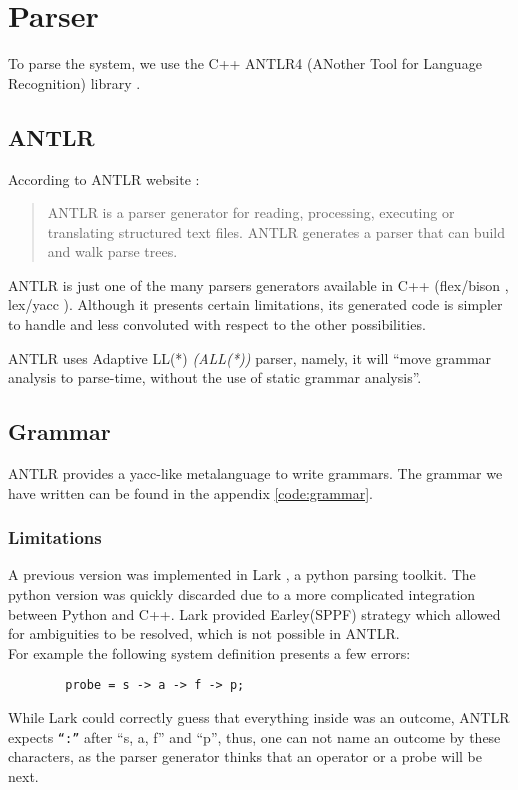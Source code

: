 \section{Parser}
        To parse the system, we use the C++ ANTLR4 (ANother Tool for Language Recognition) library \cite{antlr4}. 
        \subsection{ANTLR}
    According to ANTLR website \cite{antlr4}: 
    \begin{quote}
        ANTLR is a parser generator for reading, processing, executing or translating structured text files. ANTLR generates a parser that can build and walk parse trees.
    \end{quote}

 ANTLR is just one of the many parsers generators available in C++ (flex/bison \cite{flexb}, lex/yacc \cite{lexy}). Although it presents certain limitations, its generated code is simpler to handle and less convoluted with respect to the other possibilities.

        ANTLR uses Adaptive LL(*) \textit{(ALL(*))} parser, namely, it will ``move grammar analysis to parse-time, without the use of static grammar analysis''. \cite{antlr}

        \subsection{Grammar}
            ANTLR provides a yacc-like metalanguage \cite{antlr} to write grammars. The grammar we have written can be found in the appendix \ref{code:grammar}.
              
    \subsubsection{Limitations}
        A previous version was implemented in Lark \cite{lark}, a python parsing toolkit. The python version was quickly discarded due to a more complicated integration between Python and C++. Lark provided Earley(SPPF) strategy which allowed for ambiguities to be resolved, which is not possible in ANTLR. \\
        For example the following system definition presents a few errors:
        \begin{verbatim}
        probe = s -> a -> f -> p;
        \end{verbatim}
    While Lark could correctly guess that everything inside was an outcome, ANTLR expects \texttt{``:''} after ``s, a, f'' and ``p'', thus, one can not name an outcome by these characters, as the parser generator thinks that an operator or a probe will be next. 
